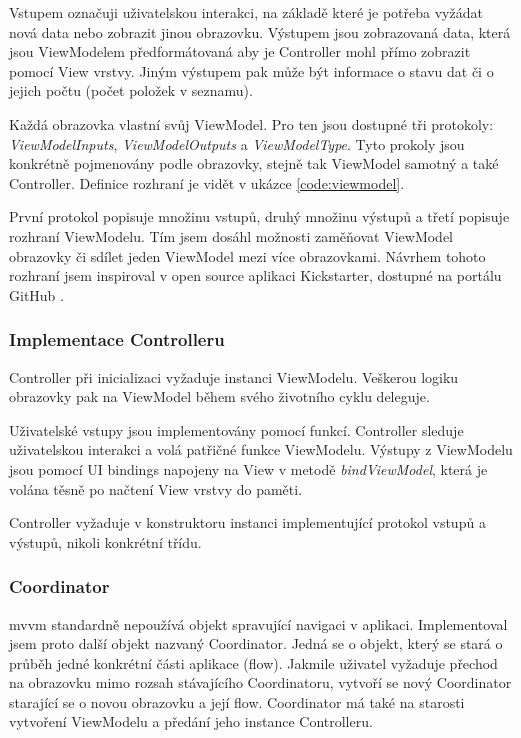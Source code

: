 Vstupem označuji uživatelskou interakci, na základě které je potřeba vyžádat nová data nebo zobrazit jinou obrazovku.
Výstupem jsou zobrazovaná data, která jsou ViewModelem předformátovaná aby je Controller mohl přímo zobrazit pomocí View vrstvy.
Jiným výstupem pak může být informace o stavu dat či o jejich počtu (počet položek v seznamu).

Každá obrazovka vlastní svůj ViewModel.
Pro ten jsou dostupné tři protokoly: \textit{ViewModelInputs}, \textit{ViewModelOutputs} a \textit{ViewModelType}.
Tyto prokoly jsou konkrétně pojmenovány podle obrazovky, stejně tak ViewModel samotný a také Controller.
Definice rozhraní je vidět v ukázce \ref{code:viewmodel}.


První protokol popisuje množinu vstupů, druhý množinu výstupů a třetí popisuje rozhraní ViewModelu.
Tím jsem dosáhl možnosti zaměňovat ViewModel obrazovky či sdílet jeden ViewModel mezi více obrazovkami.
Návrhem tohoto rozhraní jsem inspiroval v open source aplikaci Kickstarter, dostupné na portálu GitHub \cite{github-kickstarter}.

\subsubsection*{Implementace Controlleru}

Controller při inicializaci vyžaduje instanci ViewModelu.
Veškerou logiku obrazovky pak na ViewModel během svého životního cyklu deleguje.

Uživatelské vstupy jsou implementovány pomocí funkcí.
Controller sleduje uživatelskou interakci a volá patřičné funkce ViewModelu.
Výstupy z ViewModelu jsou pomocí UI bindings napojeny na View v metodě \textit{bindViewModel}, která je volána těsně po načtení View vrstvy do paměti.

Controller vyžaduje v konstruktoru instanci implementující protokol vstupů a výstupů, nikoli konkrétní třídu.

\subsubsection*{Coordinator}

\acrshort{mvvm} standardně nepoužívá objekt spravující navigaci v aplikaci.
Implementoval jsem proto další objekt nazvaný Coordinator.
Jedná se o objekt, který se stará o průběh jedné konkrétní části aplikace (flow).
Jakmile uživatel vyžaduje přechod na obrazovku mimo rozsah stávajícího Coordinatoru, vytvoří se nový Coordinator starající se o novou obrazovku a její flow.
Coordinator má také na starosti vytvoření ViewModelu a předání jeho instance Controlleru.

